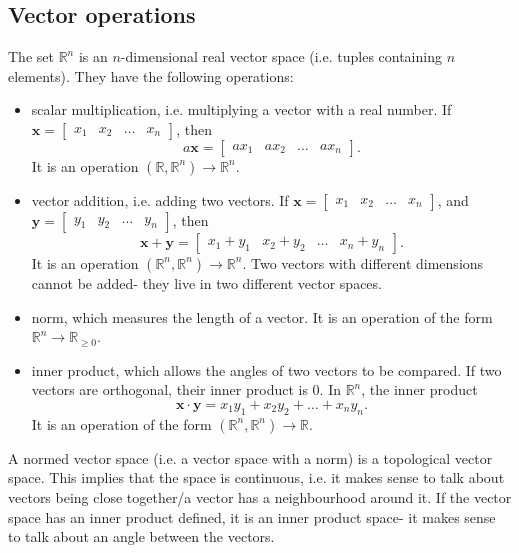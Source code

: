 \documentclass[a4paper, openany]{memoir}
\begin{document}
    \subsection{Vector operations}
    The set $\mathbb{R}^n$ is an $n$-dimensional real vector space (i.e. tuples containing $n$ elements). They have the following operations:
    \begin{itemize}
        \item scalar multiplication, i.e. multiplying a vector with a real number. If $\mathbf{x} = \begin{bmatrix}
            x_1 & x_2 & \dots & x_n
        \end{bmatrix}$, then
        \[a \mathbf{x} = \begin{bmatrix}
            ax_1 & ax_2 & \dots & ax_n
        \end{bmatrix}.\]
        It is an operation $(\mathbb{R}, \mathbb{R}^n) \to \mathbb{R}^n$.
        
        \item vector addition, i.e. adding two vectors. If $\mathbf{x} = \begin{bmatrix}
            x_1 & x_2 & \dots & x_n
        \end{bmatrix}$, and $\mathbf{y} = \begin{bmatrix}
            y_1 & y_2 & \dots & y_n
        \end{bmatrix}$, then
        \[\mathbf{x} + \mathbf{y} = \begin{bmatrix}
            x_1 + y_1 & x_2 + y_2 & \dots & x_n + y_n
        \end{bmatrix}.\]
        It is an operation $(\mathbb{R}^n, \mathbb{R}^n) \to \mathbb{R}^n$. Two vectors with different dimensions cannot be added- they live in two different vector spaces.

        \item norm, which measures the length of a vector. It is an operation of the form $\mathbb{R}^n \to \mathbb{R}_{\geq 0}$.
        
        \item inner product, which allows the angles of two vectors to be compared. If two vectors are orthogonal, their inner product is 0. In $\mathbb{R}^n$, the inner product
        \[\mathbf{x} \cdot \mathbf{y} = x_1 y_1 + x_2 y_2 + \dots + x_n y_n.\]
        It is an operation of the form $(\mathbb{R}^n, \mathbb{R}^n) \to \mathbb{R}$.
    \end{itemize}
    
    A normed vector space (i.e. a vector space with a norm) is a topological vector space. This implies that the space is continuous, i.e. it makes sense to talk about vectors being close together/a vector has a neighbourhood around it. If the vector space has an inner product defined, it is an inner product space- it makes sense to talk about an angle between the vectors.
\end{document}
